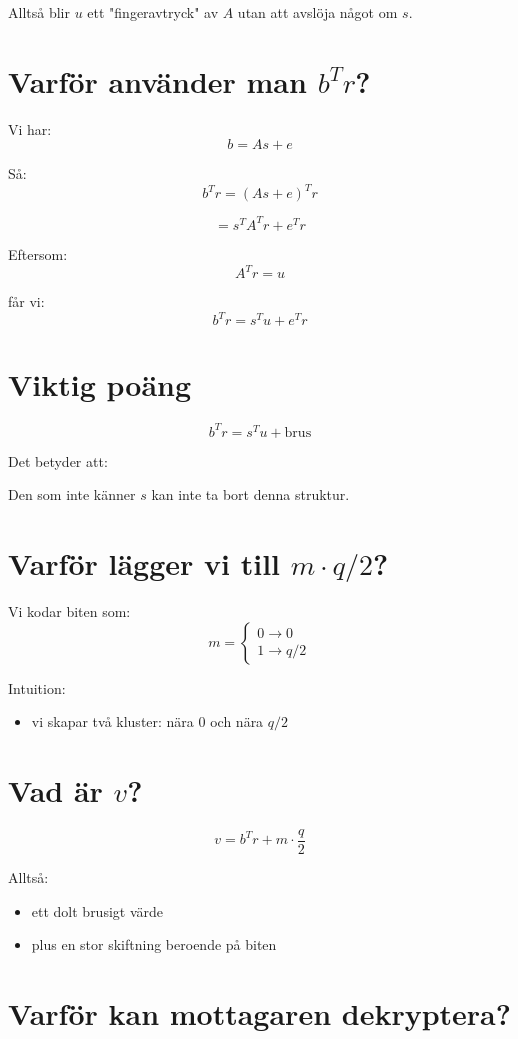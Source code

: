 \documentclass{article}
\begin{document}
Alltså blir $u$ ett "fingeravtryck" av $A$ utan att avslöja något om $s$.

\section{Varför använder man $b^T r$?}

Vi har:
\[
b = As + e
\]

Så:
\[
b^T r = (As + e)^T r
\]

\[
= s^T A^T r + e^T r
\]

Eftersom:
\[
A^T r = u
\]

får vi:
\[
b^T r = s^T u + e^T r
\]

\section{Viktig poäng}

\[
b^T r = s^T u + \text{brus}
\]

Det betyder att:

Den som inte känner $s$ kan inte ta bort denna struktur.

\section{Varför lägger vi till $m \cdot q/2$?}

Vi kodar biten som:
\[
m =
\begin{cases}
0 \rightarrow 0 \\
1 \rightarrow q/2
\end{cases}
\]

Intuition:
\begin{itemize}
\item vi skapar två kluster: nära 0 och nära $q/2$
\end{itemize}

\section{Vad är $v$?}

\[
v = b^T r + m \cdot \frac{q}{2}
\]

Alltså:
\begin{itemize}
\item ett dolt brusigt värde
\item plus en stor skiftning beroende på biten
\end{itemize}

\section{Varför kan mottagaren dekryptera?}
\end{document}
